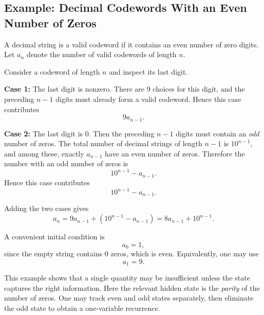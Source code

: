 \subsection{Example: Decimal Codewords With an Even Number of Zeros}

A decimal string is a valid codeword if it contains an even number of zero digits. Let $a_n$ denote the number of valid codewords of length $n$.

\begin{examplebox}[title={Codeword recurrence via last digit}]
Consider a codeword of length $n$ and inspect its last digit.

\textbf{Case 1:} The last digit is nonzero.
There are $9$ choices for this digit, and the preceding $n-1$ digits must already form a valid codeword. Hence this case contributes
\[
9a_{n-1}.
\]

\textbf{Case 2:} The last digit is $0$.
Then the preceding $n-1$ digits must contain an \emph{odd} number of zeros. The total number of decimal strings of length $n-1$ is $10^{n-1}$, and among these, exactly $a_{n-1}$ have an even number of zeros. Therefore the number with an odd number of zeros is
\[
10^{n-1}-a_{n-1}.
\]
Hence this case contributes
\[
10^{n-1}-a_{n-1}.
\]

Adding the two cases gives
\[
a_n=9a_{n-1}+(10^{n-1}-a_{n-1})=8a_{n-1}+10^{n-1}.
\]
\end{examplebox}

A convenient initial condition is
\[
a_0=1,
\]
since the empty string contains $0$ zeros, which is even. Equivalently, one may use
\[
a_1=9.
\]

\begin{center}
\end{center}

\begin{extension}[title={State augmentation viewpoint}]
This example shows that a single quantity may be insufficient unless the state captures the right information. Here the relevant hidden state is the \emph{parity} of the number of zeros. One may track even and odd states separately, then eliminate the odd state to obtain a one-variable recurrence.
\end{extension}

